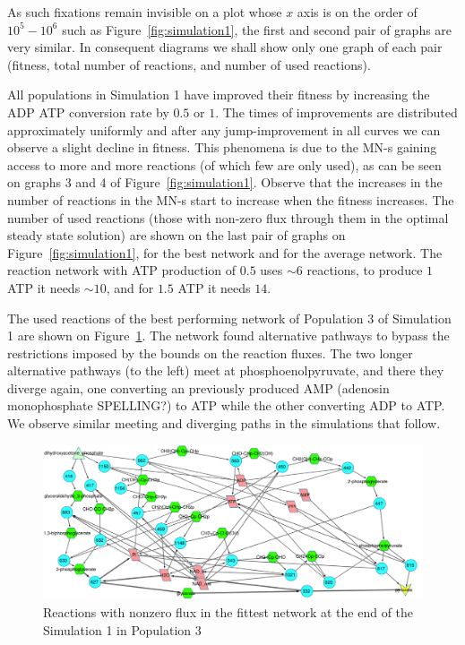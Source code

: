 \documentclass[10pt,a4paper]{article}
\begin{document}
As such fixations remain invisible on a plot whose $x$ axis is on the order of $10^5-10^6$ such as Figure~\ref{fig:simulation1}, the first and second pair of graphs are very similar. In consequent diagrams we shall show only one graph of each pair (fitness, total number of reactions, and number of used reactions).

All populations in Simulation 1 have improved their fitness by increasing the ADP ATP conversion rate by $0.5$ or $1$. The times of improvements are distributed approximately uniformly and after any jump-improvement in all curves we can observe a slight decline in fitness. This phenomena is due to the MN-s gaining access to more and more reactions (of which few are only used), as can be seen on graphs 3 and 4 of Figure~\ref{fig:simulation1}. Observe that the increases in the number of reactions in the MN-s start to increase when the fitness increases. The number of used reactions (those with non-zero flux through them in the optimal steady state solution) are shown on the last pair of graphs on Figure~\ref{fig:simulation1}, for the best network and for the average network. The reaction network with ATP production of $0.5$ uses $\sim 6$ reactions, to produce $1$ ATP it needs $\sim 10$, and for $1.5$ ATP it needs $14$. 

The used reactions of the best performing network of Population 3 of Simulation 1 are shown on Figure~\ref{fig:trunk_glyc_final_job1}. The network found alternative pathways to bypass the restrictions imposed by the bounds on the reaction fluxes. The two longer alternative pathways (to the left) meet at phosphoenolpyruvate, and there they diverge again, one converting an previously produced AMP (adenosin monophosphate SPELLING?) to ATP while the other converting ADP to ATP. We observe similar meeting and diverging paths in the simulations that follow. 



\begin{figure}[htpb]
	\centering
	\includegraphics[width=1\linewidth]{trunk_glyc_final_job1.pdf}
	\caption{Reactions with nonzero flux in the fittest network at the end of the Simulation 1 in Population 3}
	\label{fig:trunk_glyc_final_job1}
\end{figure}
\end{document}
